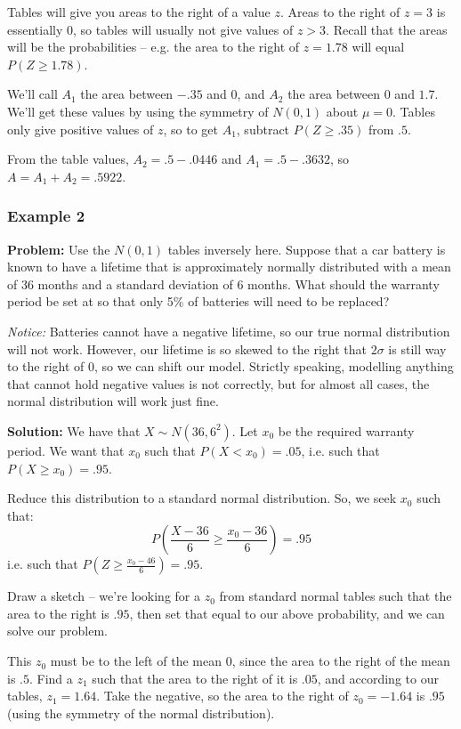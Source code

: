 \documentclass[12pt]{article}
\begin{document}
Tables will give you areas to the right of a value $z$. Areas to the right of $z=3$ is essentially 0, so tables will usually not give values of $z>3$. Recall that the areas will be the probabilities -- e.g. the area to the right of $z=1.78$ will equal $P(Z \geq 1.78)$.

We'll call $A_1$ the area between $-.35$ and 0, and $A_2$ the area between $0$ and $1.7$. We'll get these values by using the symmetry of $N(0,1)$ about $\mu = 0$. Tables only give positive values of $z$, so to get $A_1$, subtract $P( Z \geq .35)$ from $.5$. 

From the table values, $A_2 = .5 - .0446$ and $A_1 = .5 - .3632$, so $A = A_1 + A_2 = .5922$.

\subsubsection{Example 2}
\textbf{Problem:} Use the $N(0,1)$ tables inversely here. Suppose that a car battery is known to have a lifetime that is approximately normally distributed with a mean of 36 months and a standard deviation of 6 months. What should the warranty period be set at so that only 5\% of batteries will need to be replaced?

\emph{Notice:} Batteries cannot have a negative lifetime, so our true normal distribution will not work. However, our lifetime is so skewed to the right that $2 \sigma$ is still way to the right of $0$, so we can shift our model. Strictly speaking, modelling anything that cannot hold negative values is not correctly, but for almost all cases, the normal distribution will work just fine.

\textbf{Solution:} We have that $X \sim N(36,6^2)$. Let $x_0$ be the required warranty period. We want that $x_0$ such that $P(X < x_0) = .05$, i.e. such that $P(X \geq x_0) = .95$. 

Reduce this distribution to a standard normal distribution. So, we seek $x_0$ such that:
\[
    P(\frac{X-36}{6} \geq \frac{x_0 - 36}{6}) = .95
\]
i.e. such that $P(Z \geq \frac{x_0 - 46}{6}) = .95$.

Draw a sketch -- we're looking for a $z_0$ from standard normal tables such that the area to the right is $.95$, then set that equal to our above probability, and we can solve our problem.

This $z_0$ must be to the left of the mean 0, since the area to the right of the mean is $.5$. Find a $z_1$ such that the area to the right of it is $.05$, and according to our tables, $z_1 = 1.64$. Take the negative, so the area to the right of $z_0 = -1.64$ is $.95$ (using the symmetry of the normal distribution). 
\end{document}
